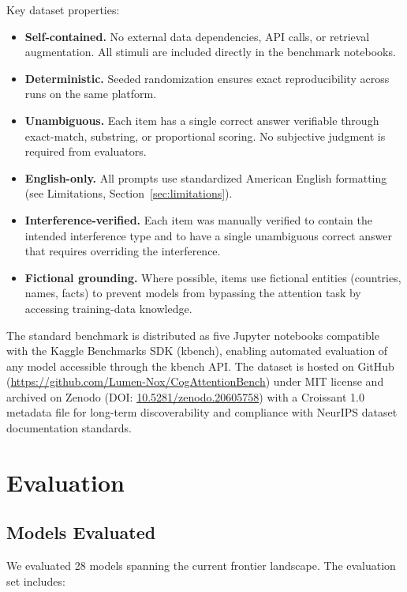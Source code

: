 \documentclass{article}
\begin{document}
Key dataset properties:

\begin{itemize}
    \item \textbf{Self-contained.} No external data dependencies, API calls, or retrieval augmentation. All stimuli are included directly in the benchmark notebooks.
    \item \textbf{Deterministic.} Seeded randomization ensures exact reproducibility across runs on the same platform.
    \item \textbf{Unambiguous.} Each item has a single correct answer verifiable through exact-match, substring, or proportional scoring. No subjective judgment is required from evaluators.
    \item \textbf{English-only.} All prompts use standardized American English formatting (see Limitations, Section~\ref{sec:limitations}).
    \item \textbf{Interference-verified.} Each item was manually verified to contain the intended interference type and to have a single unambiguous correct answer that requires overriding the interference.
    \item \textbf{Fictional grounding.} Where possible, items use fictional entities (countries, names, facts) to prevent models from bypassing the attention task by accessing training-data knowledge.
\end{itemize}

The standard benchmark is distributed as five Jupyter notebooks compatible with the Kaggle Benchmarks SDK (kbench), enabling automated evaluation of any model accessible through the kbench API. The dataset is hosted on GitHub (\url{https://github.com/Lumen-Nox/CogAttentionBench}) under MIT license and archived on Zenodo (DOI: \href{https://doi.org/10.5281/zenodo.20605758}{10.5281/zenodo.20605758}) with a Croissant 1.0 metadata file for long-term discoverability and compliance with NeurIPS dataset documentation standards.

\section{Evaluation}

\subsection{Models Evaluated}

We evaluated 28 models spanning the current frontier landscape. The evaluation set includes:
\end{document}

